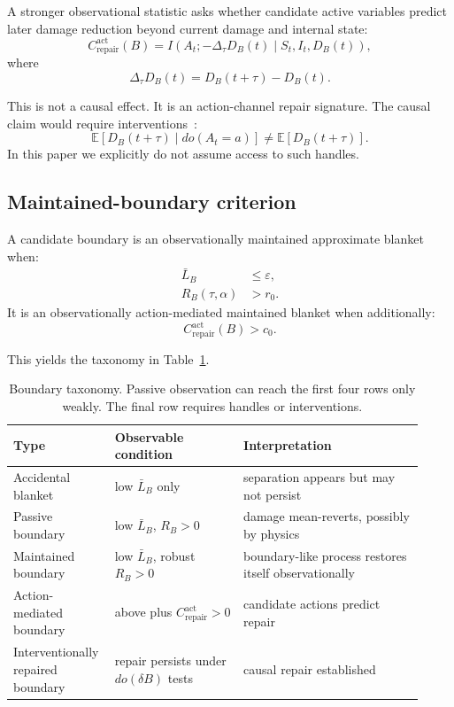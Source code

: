 \documentclass[11pt]{article}
\newcommand{\E}{\mathbb{E}}
\newcommand{\MI}{I}
\newcommand{\given}{\mid}
\begin{document}
A stronger observational statistic asks whether candidate active variables predict later damage reduction beyond current damage and internal state:
\begin{equation}
  C_{\mathrm{repair}}^{\mathrm{act}}(B)
  =
  \MI
  \left(
    A_t;
    -\Delta_\tau D_B(t)
    \given
    S_t,I_t,D_B(t)
  \right),
  \label{eq:action-repair}
\end{equation}
where
\begin{equation}
  \Delta_\tau D_B(t) = D_B(t+\tau)-D_B(t).
\end{equation}

This is not a causal effect. It is an action-channel repair signature. The causal claim would require interventions~\cite{pearl2009causality}:
\begin{equation}
  \E[D_B(t+\tau)\given do(A_t=a)]
  \neq
  \E[D_B(t+\tau)].
\end{equation}
In this paper we explicitly do not assume access to such handles.

\subsection{Maintained-boundary criterion}

A candidate boundary is an observationally maintained approximate blanket when:
\begin{align}
  \bar{L}_B &\leq \varepsilon,
  \label{eq:criterion-1}
  \\
  R_B(\tau,\alpha) &> r_0.
  \label{eq:criterion-2}
\end{align}
It is an observationally action-mediated maintained blanket when additionally:
\begin{equation}
  C_{\mathrm{repair}}^{\mathrm{act}}(B) > c_0.
  \label{eq:criterion-3}
\end{equation}

This yields the taxonomy in Table~\ref{tab:taxonomy}.

\begin{table}[h]
\centering
\small
\begin{tabular}{@{}p{0.20\linewidth}p{0.30\linewidth}p{0.42\linewidth}@{}}
\toprule
Type & Observable condition & Interpretation \\
\midrule
Accidental blanket & low $\bar{L}_B$ only & separation appears but may not persist \\
Passive boundary & low $\bar{L}_B$, $R_B>0$ & damage mean-reverts, possibly by physics \\
Maintained boundary & low $\bar{L}_B$, robust $R_B>0$ & boundary-like process restores itself observationally \\
Action-mediated boundary & above plus $C_{\mathrm{repair}}^{\mathrm{act}}>0$ & candidate actions predict repair \\
Interventionally repaired boundary & repair persists under $do(\delta B)$ tests & causal repair established \\
\bottomrule
\end{tabular}
\caption{Boundary taxonomy. Passive observation can reach the first four rows only weakly. The final row requires handles or interventions.}
\label{tab:taxonomy}
\end{table}
\end{document}
